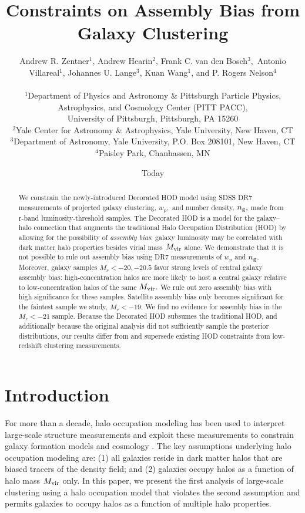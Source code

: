 \documentclass[usenatbib,usegraphicx,letterpaper]{mn2e}
\title[Clustering Constraints on Assembly Bias]
{
Constraints on Assembly Bias from Galaxy Clustering
}
\author[Zentner et al.]
{Andrew R. Zentner$^{1}$, Andrew Hearin$^{2}$, Frank C. van den Bosch$^{3},$ \newauthor
Antonio Villareal$^{1}$, Johannes U. Lange$^{3}$, Kuan Wang$^{1}$, and P. Rogers Nelson$^{4}$\\ \\
$^1$Department of Physics and Astronomy \& Pittsburgh Particle Physics, Astrophysics, and Cosmology Center (PITT PACC),\\ University of Pittsburgh, Pittsburgh, PA 15260\\
$^2$Yale Center for Astronomy \& Astrophysics, Yale University, New Haven, CT\\
$^3$Department of Astronomy, Yale University, P.O. Box 208101, New Haven, CT\\
$^4$Paisley Park, Chanhassen, MN\\
}
\date{Today}
\newcommand{\mvir}{M_{\rm vir}}
\newcommand{\wprp}{w_{\mathrm{p}}}
\newcommand{\magr}{M_r}
\begin{document}
\maketitle
\begin{abstract}
  We constrain the newly-introduced Decorated HOD model using SDSS DR7
  measurements of projected galaxy clustering, $\wprp,$ and number
  density, $n_{\rm g},$ made from r-band luminosity-threshold
  samples. The Decorated HOD is a model for the galaxy--halo
  connection that augments the traditional Halo Occupation
  Distribution (HOD) by allowing for the possibility of {\em assembly
    bias}: galaxy luminosity may be correlated with dark matter halo
  properties besides virial mass $\mvir$ alone. We demonstrate that it
  is not possible to rule out assembly bias using DR7 measurements of
  $\wprp$ and $n_{\rm g}.$ Moreover, galaxy samples $\magr<-20, -20.5$
  favor strong levels of central galaxy assembly bias:
  high-concentration halos are more likely to host a central galaxy
  relative to low-concentration halos of the same $\mvir.$ We rule out
  zero assembly bias with high significance for these
  samples. Satellite assembly bias only becomes significant for the
  faintest sample we study, $\magr<-19.$ We find no evidence for
  assembly bias in the $\magr<-21$ sample. Because the Decorated HOD
  subsumes the traditional HOD, and additionally because the original
  \citet{zehavi_etal11} analysis did not sufficiently sample the posterior distributions,
 our results differ from and supersede existing HOD constraints from low-redshift
  clustering measurements.
\end{abstract}

\section{Introduction}
\label{section:introduction}

For more than a decade, halo occupation modeling has been used to
interpret large-scale structure measurements and exploit these
measurements to constrain galaxy formation models and cosmology
\citep[e.g.,][]{yang03,tinker05,zehavi05a,
  porciani06,vdBosch07,Zheng07,conroy_wechsler09,yang09b,zehavi_etal11,guo_etal11b,
  wake_etal11,yang11a,yang12,leauthaud_etal12,rod_puebla12,tinker_etal13,cacciato_etal13,
  more_etal13,guo_etal14,zu_mandelbaum15b}. The key assumptions
underlying halo occupation modeling are: (1) all galaxies reside in
dark matter halos that are biased tracers of the density field; and
(2) galaxies occupy halos as a function of halo mass $\mvir$ only. 
In this paper, we present the first analysis of large-scale clustering using 
a halo occupation model that violates the second assumption and permits 
galaxies to occupy halos as a function of multiple halo properties.
\end{document}
